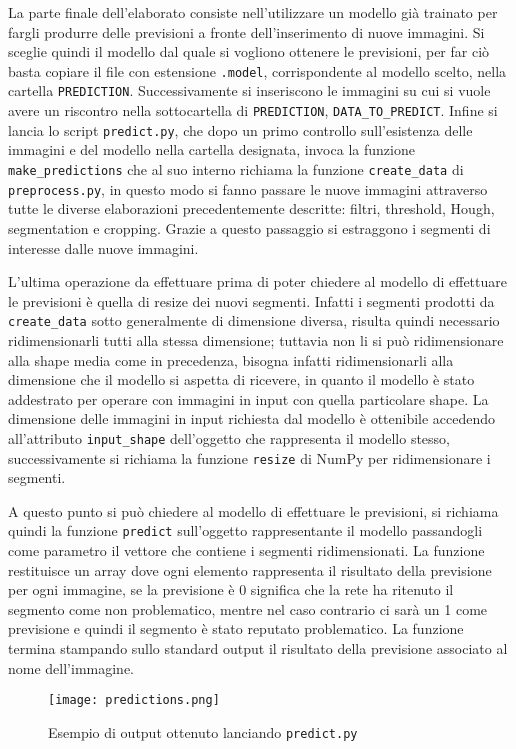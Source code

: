 La parte finale dell’elaborato consiste nell’utilizzare un modello già trainato per fargli produrre delle previsioni a fronte dell’inserimento di nuove immagini. Si sceglie quindi il modello dal quale si vogliono ottenere le previsioni, per far ciò basta copiare il file con estensione \texttt{.model}, corrispondente al modello scelto, nella cartella \texttt{PREDICTION}. Successivamente si inseriscono le immagini su cui si vuole avere un riscontro nella sottocartella di \texttt{PREDICTION}, \texttt{DATA\_TO\_PREDICT}. Infine si lancia lo script \texttt{predict.py}, che dopo un primo controllo sull’esistenza delle immagini e del modello nella cartella designata, invoca la funzione \texttt{make\_predictions} che al suo interno richiama la funzione \texttt{create\_data} di \texttt{preprocess.py}, in questo modo si fanno passare le nuove immagini attraverso tutte le diverse elaborazioni precedentemente descritte: filtri, threshold, Hough, segmentation e cropping. Grazie a questo passaggio si estraggono i segmenti di interesse dalle nuove immagini.

L’ultima operazione da effettuare prima di poter chiedere al modello di effettuare le previsioni è quella di resize dei nuovi segmenti. Infatti i segmenti prodotti da \texttt{create\_data} sotto generalmente di dimensione diversa, risulta quindi necessario ridimensionarli tutti alla stessa dimensione; tuttavia non li si può ridimensionare alla shape media come in precedenza, bisogna infatti ridimensionarli alla dimensione che il modello si aspetta di ricevere, in quanto il modello è stato addestrato per operare con immagini in input con quella particolare shape. La dimensione delle immagini in input richiesta dal modello è ottenibile accedendo all’attributo \texttt{input\_shape} dell’oggetto che rappresenta il modello stesso, successivamente si richiama la funzione \texttt{resize} di NumPy per ridimensionare i segmenti. 

A questo punto si può chiedere al modello di effettuare le previsioni, si richiama quindi la funzione \texttt{predict} sull’oggetto rappresentante il modello passandogli come parametro il vettore che contiene i segmenti ridimensionati. La funzione restituisce un array dove ogni elemento rappresenta il risultato della previsione per ogni immagine, se la previsione è 0 significa che la rete ha ritenuto il segmento come non problematico, mentre nel caso contrario ci sarà un 1 come previsione e quindi il segmento è stato reputato problematico. La funzione termina stampando sullo standard output il risultato della previsione associato al nome dell’immagine.

\begin{figure}[h]
  \centering
  \texttt{[image: predictions.png]}
  \caption{Esempio di output ottenuto lanciando \texttt{predict.py}}
\end{figure}
